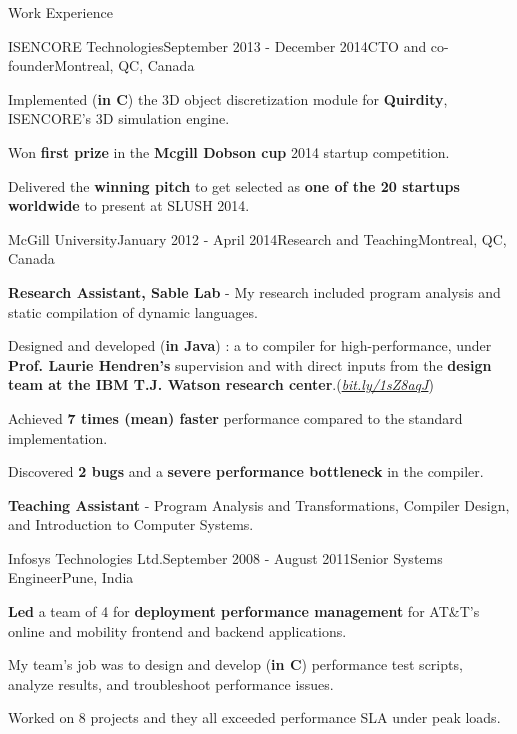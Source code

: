 \documentclass{resume} %
\begin{document}
\begin{rSection}{Work Experience}
\begin{rSubsection}{ISENCORE Technologies}{September 2013 - December 2014}{CTO
  and co-founder}{Montreal, QC, Canada}
\item Implemented (\textbf{in C}) the 3D object discretization module for \textbf{Quirdity},
  ISENCORE's 3D simulation engine.
\item Won \textbf{first prize} in the \textbf{Mcgill Dobson cup} 2014 startup competition. 
\item Delivered the \textbf{winning pitch} to get selected as \textbf{one of the 20 startups
  worldwide} to present at SLUSH 2014.
\end{rSubsection}

\begin{rSubsection}{McGill University}{January 2012 - April 2014}{Research and
Teaching}{Montreal, QC, Canada} 
\item \textbf{Research Assistant, Sable Lab} - My research included program
analysis and static compilation of dynamic languages.

\begin{lsubSubsection}
\item Designed and developed (\textbf{in Java}) \mixtenx: a \matlab to
\xten  compiler for high-performance, under \textbf{Prof.
Laurie Hendren's} supervision and with direct inputs from the \textbf{\xten
design team at the IBM T.J. Watson research
center}.(\href{http://bit.ly/1sZ8aqJ}{\em{bit.ly/1sZ8aqJ}})  
 \item Achieved \textbf{7 times (mean) faster} performance compared to the
 standard \matlab implementation.
  \item Discovered \textbf{2 bugs} and a \textbf{severe performance bottleneck}
in the \xten compiler.  
\end{lsubSubsection}
\item \textbf{Teaching Assistant} - Program Analysis and Transformations,
	Compiler Design, and Introduction to Computer Systems.
\end{rSubsection}

\begin{rSubsection}{Infosys Technologies Ltd.}{September 2008 - August
2011}{Senior Systems Engineer}{Pune, India}
\item \textbf{Led} a team of 4 for \textbf{deployment performance management}
for AT\&T's online and mobility frontend and backend applications.
\begin{lsubSubsection}
\item My team's job was to design and develop (\textbf{in C}) performance
test scripts, analyze results, and troubleshoot performance issues.  
\item {Worked on 8 projects} and they all exceeded performance SLA under
peak loads.
\end{lsubSubsection}
\end{rSubsection}


\end{rSection}
\end{document}
